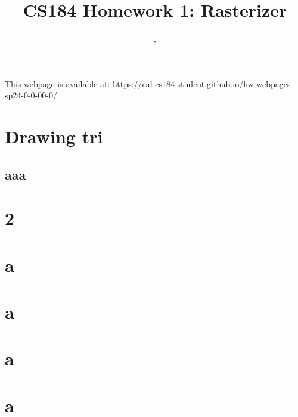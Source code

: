 \documentclass[11pt]{article}
\title{CS184 Homework 1: Rasterizer}
\author{\Name,  \SID\\\email}
\date{}
\begin{document}
\maketitle

This webpage is available at: https://cal-cs184-student.github.io/hw-webpages-sp24-0-0-00-0/
\section{Drawing tri}
\subsection{aaa}

\section{2}

\section{a}

\section{a}

\section{a}

\section{a}
\end{document}
